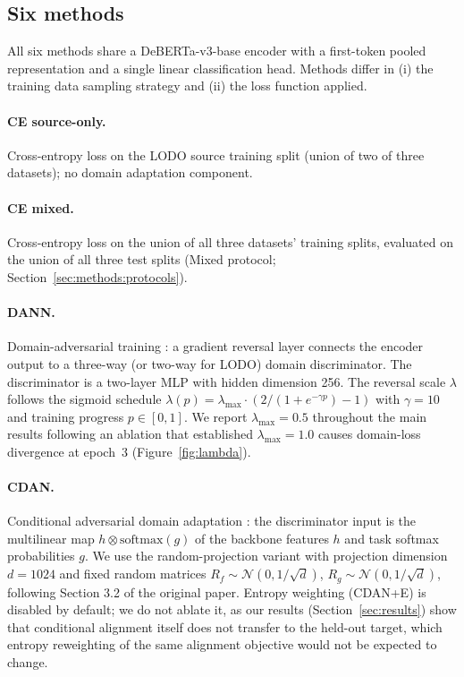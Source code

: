\subsection{Six methods}
\label{sec:methods:models}

All six methods share a DeBERTa-v3-base encoder
\citep{he2023deberta} with a first-token pooled representation and a
single linear classification head. Methods differ in (i) the
training data sampling strategy and (ii) the loss function applied.

\paragraph{CE source-only.} Cross-entropy loss on the LODO source
training split (union of two of three datasets); no domain adaptation
component.

\paragraph{CE mixed.} Cross-entropy loss on the union of all three
datasets' training splits, evaluated on the union of all three test
splits (Mixed protocol; Section~\ref{sec:methods:protocols}).

\paragraph{DANN.} Domain-adversarial training
\citep{ganin2016dann}: a gradient reversal layer connects the encoder
output to a three-way (or two-way for LODO) domain discriminator.
The discriminator is a two-layer MLP with hidden dimension 256.
The reversal scale $\lambda$ follows the sigmoid schedule
$\lambda(p) = \lambda_{\max} \cdot (2/(1 + e^{-\gamma p}) - 1)$ with
$\gamma=10$ and training progress $p \in [0, 1]$. We report
$\lambda_{\max}=0.5$ throughout the main results following an
ablation that established $\lambda_{\max}=1.0$ causes domain-loss
divergence at epoch~3 (Figure~\ref{fig:lambda}).

\paragraph{CDAN.} Conditional adversarial domain adaptation
\citep{long2018cdan}: the discriminator input is the multilinear map
$h \otimes \text{softmax}(g)$ of the backbone features $h$ and task
softmax probabilities $g$. We use the random-projection variant with
projection dimension $d=1024$ and fixed random matrices
$R_f \sim \mathcal{N}(0, 1/\sqrt{d})$, $R_g \sim \mathcal{N}(0, 1/\sqrt{d})$,
following Section 3.2 of the original paper. Entropy weighting
(CDAN+E) is disabled by default; we do not ablate it, as our results
(Section~\ref{sec:results}) show that conditional alignment itself
does not transfer to the held-out target, which entropy reweighting
of the same alignment objective would not be expected to change.


